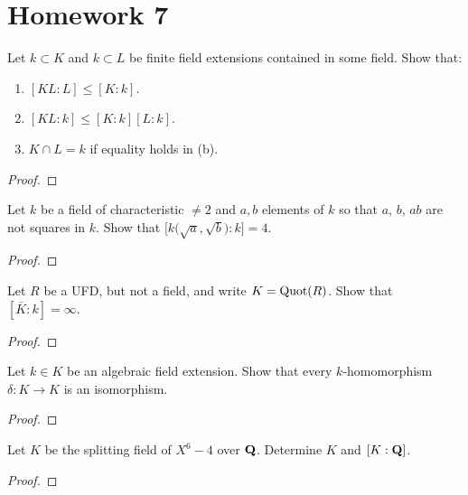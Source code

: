 \chapter{Homework 7}
\begin{problem}
Let $k\subset K$ and $k\subset L$ be finite field extensions contained in
some field. Show that:
\begin{enumerate}[label=(\alph*)]
\item $[KL:L]\leq [K:k]$.
\item $[KL:k]\leq [K:k][L:k]$.
\item $K\cap L=k$ if equality holds in (b).
\end{enumerate}
\end{problem}
\begin{proof}
\end{proof}

\begin{problem}
Let $k$ be a field of characteristic $\neq 2$ and $a,b$ elements of $k$ so
that $a$, $b$, $ab$ are not squares in $k$. Show that
$\bigl[k\bigl(\sqrt{a},\sqrt{b}\bigr):k\bigr]=4$.
\end{problem}
\begin{proof}
\end{proof}

\begin{problem}
Let $R$ be a UFD, but not a field, and write $K=\operatorname{Quot}(R)$. Show that $[\bar
K:k]=\infty$.
\end{problem}
\begin{proof}
\end{proof}

\begin{problem}
Let $k\in K$ be an algebraic field extension. Show that every
$k$-homomorphism $\delta\colon K\to K$ is an isomorphism.
\end{problem}
\begin{proof}
\end{proof}

\begin{problem}
Let $K$ be the splitting field of $X^6-4$ over $\mathbf{Q}$. Determine $K$ and
$[K:\mathbf{Q}]$.
\end{problem}
\begin{proof}
\end{proof}

